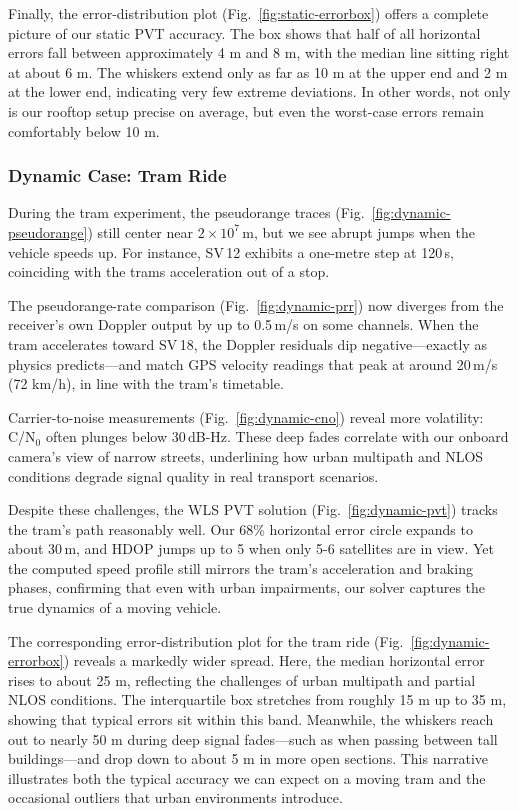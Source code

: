         Finally, the error-distribution plot (Fig.~\ref{fig:static-errorbox}) offers a complete picture of our static PVT accuracy. The box shows that half of all horizontal errors fall between approximately 4 m and 8 m, with the median line sitting right at about 6 m. The whiskers extend only as far as 10 m at the upper end and 2 m at the lower end, indicating very few extreme deviations. In other words, not only is our rooftop setup precise on average, but even the worst-case errors remain comfortably below 10 m.

        \subsubsection{Dynamic Case: Tram Ride}
        
        During the tram experiment, the pseudorange traces (Fig.~\ref{fig:dynamic-pseudorange}) still center near $2\times10^{7}$\,m, but we see abrupt jumps when the vehicle speeds up. For instance, SV\,12 exhibits a one-metre step at 120\,s, coinciding with the trams acceleration out of a stop.
        
        The pseudorange-rate comparison (Fig.~\ref{fig:dynamic-prr}) now diverges from the receiver's own Doppler output by up to 0.5\,m/s on some channels. When the tram accelerates toward SV\,18, the Doppler residuals dip negative—exactly as physics predicts—and match GPS velocity readings that peak at around 20\,m/s (72 km/h), in line with the tram's timetable.
        
        Carrier-to-noise measurements (Fig.~\ref{fig:dynamic-cno}) reveal more volatility: C/N$_0$ often plunges below 30\,dB-Hz. These deep fades correlate with our onboard camera's view of narrow streets, underlining how urban multipath and NLOS conditions degrade signal quality in real transport scenarios.
        
        Despite these challenges, the WLS PVT solution (Fig.~\ref{fig:dynamic-pvt}) tracks the tram's path reasonably well. Our 68\% horizontal error circle expands to about 30\,m, and HDOP jumps up to 5 when only 5-6 satellites are in view. Yet the computed speed profile still mirrors the tram's acceleration and braking phases, confirming that even with urban impairments, our solver captures the true dynamics of a moving vehicle.
        
        The corresponding error-distribution plot for the tram ride (Fig.~\ref{fig:dynamic-errorbox}) reveals a markedly wider spread. Here, the median horizontal error rises to about 25 m, reflecting the challenges of urban multipath and partial NLOS conditions. The interquartile box stretches from roughly 15 m up to 35 m, showing that typical errors sit within this band. Meanwhile, the whiskers reach out to nearly 50 m during deep signal fades—such as when passing between tall buildings—and drop down to about 5 m in more open sections. This narrative illustrates both the typical accuracy we can expect on a moving tram and the occasional outliers that urban environments introduce.


